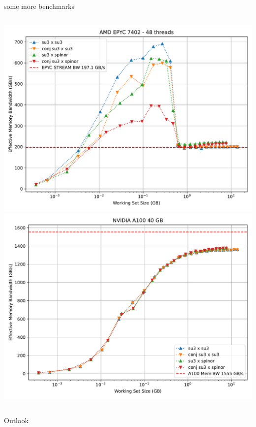 \begin{frame}{some more benchmarks}

  \begin{columns}
      \includegraphics[width=\textwidth]{figs/sun_spinor_benchmark_epyc.pdf}
      \includegraphics[width=\textwidth]{figs/sun_spinor_benchmark_a100.pdf}
  \end{columns}

\end{frame}

\begin{frame}{Outlook}

  
\end{frame}


